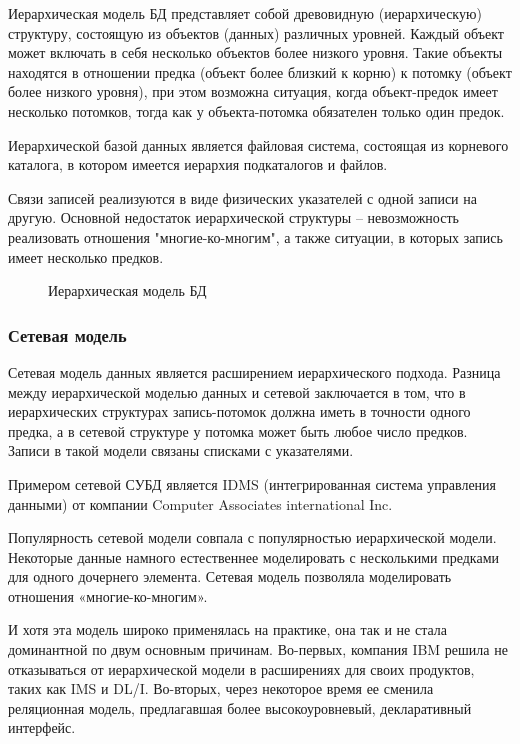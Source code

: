 Иерархическая модель БД представляет собой древовидную (иерархическую) структуру, состоящую из объектов (данных) различных уровней. Каждый объект может включать в себя несколько объектов более низкого уровня. Такие объекты находятся в отношении предка (объект более близкий к корню) к потомку (объект более низкого уровня), при этом возможна ситуация, когда объект-предок имеет несколько потомков, тогда как у объекта-потомка обязателен только один предок.

Иерархической базой данных является файловая система, состоящая из корневого каталога, в котором имеется иерархия подкаталогов и файлов.

Связи записей реализуются в виде физических указателей с одной записи на другую. Основной недостаток иерархической структуры – невозможность реализовать отношения "многие-ко-многим", а также ситуации, в которых запись имеет несколько предков. \cite{0}

\begin{figure}[h]
\caption{Иерархическая модель БД}
\label{fig:image}
\end{figure}

\subsubsection{Сетевая модель}
 \setcounter{subsubsection}{2}
 
 Сетевая модель данных является расширением иерархического подхода. 
 Разница между иерархической моделью данных и сетевой заключается в том, что в иерархических структурах запись-потомок должна иметь в точности одного предка, а в сетевой структуре у потомка может быть любое число предков. 
Записи в такой модели связаны списками с указателями.
 
Примером сетевой СУБД является IDMS (интегрированная система управления данными) от компании Computer Associates international Inc.

Популярность сетевой модели совпала с популярностью иерархической модели. 
Некоторые данные намного естественнее моделировать с несколькими предками для одного дочернего элемента. 
Сетевая модель позволяла моделировать отношения «многие-ко-многим».

И хотя эта модель широко применялась на практике, она так и не стала доминантной по двум основным причинам. 
Во-первых, компания IBM решила не отказываться от иерархической модели в расширениях для своих продуктов, таких как IMS и DL/I. 
Во-вторых, через некоторое время ее сменила реляционная модель, предлагавшая более высокоуровневый, декларативный интерфейс. \cite{0}

